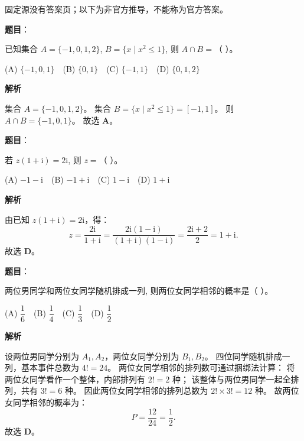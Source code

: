 
\begin{gktip}
固定源没有答案页；以下为非官方推导，不能称为官方答案。
\end{gktip}


\begin{answer}

\textbf{题目}：

已知集合 $A = \{-1, 0, 1, 2\}$, $B = \{x \mid x^2 \leqslant 1\}$, 则 $A \cap B =$（ ）。

(A) $\{-1, 0, 1\}$　(B) $\{0, 1\}$　(C) $\{-1, 1\}$　(D) $\{0, 1, 2\}$

\textbf{解析}

集合 $A = \{-1, 0, 1, 2\}$。
集合 $B = \{x \mid x^2 \leqslant 1\} = [-1, 1]$。
则 $A \cap B = \{-1, 0, 1\}$。
故选 \textbf{A}。


\end{answer}
\begin{answer}

\textbf{题目}：

若 $z(1 + \mathrm{i}) = 2\mathrm{i}$, 则 $z =$（ ）。

(A) $-1 - \mathrm{i}$　(B) $-1 + \mathrm{i}$　(C) $1 - \mathrm{i}$　(D) $1 + \mathrm{i}$

\textbf{解析}

由已知 $z(1 + \mathrm{i}) = 2\mathrm{i}$，得：
\nopagebreak[4]
\[z = \frac{2\mathrm{i}}{1 + \mathrm{i}} = \frac{2\mathrm{i}(1 - \mathrm{i})}{(1 + \mathrm{i})(1 - \mathrm{i})} = \frac{2\mathrm{i} + 2}{2} = 1 + \mathrm{i}.\]
故选 \textbf{D}。


\end{answer}
\begin{answer}

\textbf{题目}：

两位男同学和两位女同学随机排成一列, 则两位女同学相邻的概率是（ ）。

(A) $\dfrac{1}{6}$　(B) $\dfrac{1}{4}$　(C) $\dfrac{1}{3}$　(D) $\dfrac{1}{2}$

\textbf{解析}

设两位男同学分别为 $A_1, A_2$，两位女同学分别为 $B_1, B_2$。
四位同学随机排成一列，基本事件总数为 $4! = 24$。
两位女同学相邻的排列数可通过捆绑法计算：
将两位女同学看作一个整体，内部排列有 $2! = 2$ 种；
该整体与两位男同学一起全排列，共有 $3! = 6$ 种。
因此两位女同学相邻的排列总数为 $2! \times 3! = 12$ 种。
故两位女同学相邻的概率为：
\nopagebreak[4]
\[P = \frac{12}{24} = \frac{1}{2}.\]
故选 \textbf{D}。


\end{answer}
